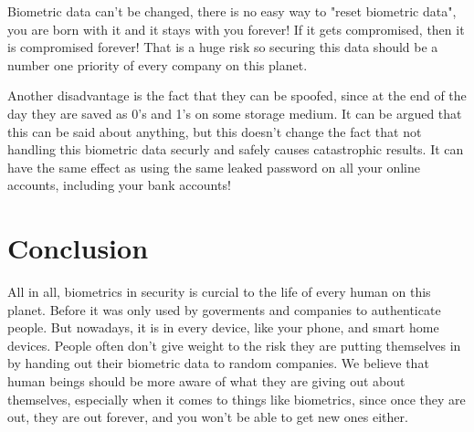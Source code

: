 \documentclass[conference]{IEEEtran}
\begin{document}
Biometric data can't be changed, there is no easy way to "reset biometric data", you are born with it and it stays with you forever! If it gets compromised, then it is compromised forever! That is a huge risk so securing this data should be a number one priority of every company on this planet.

Another disadvantage is the fact that they can be spoofed, since at the end of the day they are saved as 0's and 1's on some storage medium. It can be argued that this can be said about anything, but this doesn't change the fact that not handling this biometric data securly and safely causes catastrophic results. It can have the same effect as using the same leaked password on all your online accounts, including your bank accounts!

\section{Conclusion}

All in all, biometrics in security is curcial to the life of every human on this planet. Before it was only used by goverments and companies to authenticate people. But nowadays, it is in every device, like your phone, and smart home devices. People often don't give weight to the risk they are putting themselves in by handing out their biometric data to random companies. We believe that human beings should be more aware of what they are giving out about themselves, especially when it comes to things like biometrics, since once they are out, they are out forever, and you won't be able to get new ones either.



\end{document}
